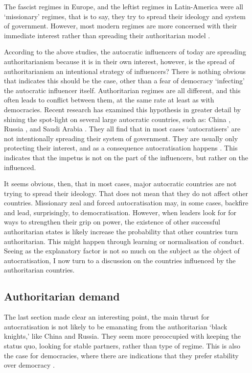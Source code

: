 The fascist regimes in Europe, and the leftist regimes in Latin-America were all `missionary' regimes, that is to say, they try to spread their ideology and system of government. However, most modern regimes are more concerned with their immediate interest rather than spreading their authoritarian model \citep{bank_study_2017, brownlee_limited_2017}. 

According to the above studies, the autocratic influencers of today are spreading authoritarianism because it is in their own interest, however, is the spread of authoritarianism an intentional strategy of influencers? There is nothing obvious that indicates this should be the case, other than a fear of democracy `infecting' the autocratic influencer itself. Authoritarian regimes are all different, and this often leads to conflict between them, at the same rate at least as with democracies. Recent research has examined this hypothesis in greater detail by shining the spot-light on several large autocratic countries, such as: China \citep{chen_democracy_2015, hackenesch_not_2015}, Russia \citep{babayan_return_2015, delcour_spoiler_2015}, and Saudi Arabia \citep{freyburg_local_2015, hassan_undermining_2015}.  They all find that in most cases `autocratisers' are not intentionally spreading their system of government. They are usually only protecting their interest, and as a consequence autocratisation happens \citep{risse_democracy_2015, borzel_noble_2015}. This indicates that the impetus is not on the part of the influencers, but rather on the influenced. 

It seems obvious, then, that in most cases, major autocratic countries are not trying to spread their ideology. That does not mean that they do not affect other countries. Missionary zeal and forced autocratisation may, in some cases, backfire \citep[p. 470]{delcour_spoiler_2015} and lead, surprisingly, to democratisation. However, when leaders look for for ways to strengthen their grip on power, the existence of other successful authoritarian states is likely increase the probability that other countries turn authoritarian. This might happen through learning or normalisation of conduct. Seeing as the explanatory factor is not so much on the subject as the object of autocratisation, I now turn to a discussion on the countries influenced by the authoritarian countries.

\subsection{Authoritarian demand}
The last section made clear an interesting point, the main thrust for autocratisation is not likely to be emanating from the authoritarian `black knights,' like China and Russia. They seem more preoccupied with keeping the status quo, looking for stable partners, rather than type of regime. This is also the case for democracies, where there are indications that they prefer stability over democracy \citep{hassan_undermining_2015, risse_democracy_2015}.

